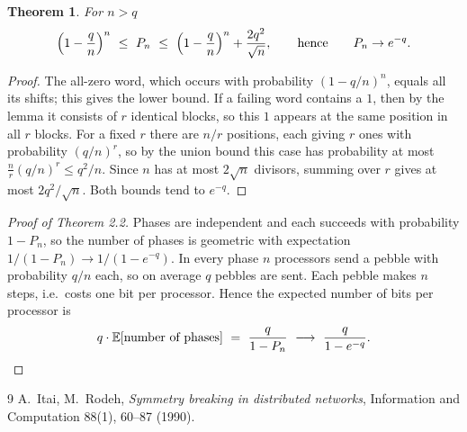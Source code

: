 \documentclass[11pt,a4paper]{article}
\newtheorem{theorem}{Theorem}
\begin{document}
\begin{theorem}
For $n>q$
\[
\Bigl(1-\frac qn\Bigr)^{n}\ \le\ P_n\ \le\ \Bigl(1-\frac qn\Bigr)^{n}+\frac{2q^2}{\sqrt n},
\qquad\text{hence}\qquad P_n\to e^{-q}.
\]
\end{theorem}
\begin{proof}
The all-zero word, which occurs with probability $(1-q/n)^n$, equals all its shifts; this gives the
lower bound. If a failing word contains a $1$, then by the lemma it consists of $r$ identical blocks,
so this $1$ appears at the same position in all $r$ blocks. For a fixed $r$ there are $n/r$
positions, each giving $r$ ones with probability $(q/n)^r$, so by the union bound this case has
probability at most $\frac nr(q/n)^r\le q^2/n$. Since $n$ has at most $2\sqrt n$ divisors, summing
over $r$ gives at most $2q^2/\sqrt n$. Both bounds tend to $e^{-q}$.
\end{proof}

\begin{proof}[Proof of Theorem 2.2]
Phases are independent and each succeeds with probability $1-P_n$, so the number of phases is
geometric with expectation $1/(1-P_n)\to 1/(1-e^{-q})$. In every phase $n$ processors send a
pebble with probability $q/n$ each, so on average $q$ pebbles are sent. Each pebble makes $n$
steps, i.e.\ costs one bit per processor. Hence the expected number of bits per processor is
\[
q\cdot\mathbb E[\text{number of phases}]\ =\ \frac q{1-P_n}\ \longrightarrow\ \frac q{1-e^{-q}}.
\qedhere
\]
\end{proof}

\begin{thebibliography}{9}
 A.~Itai, M.~Rodeh, \emph{Symmetry breaking in distributed networks}, Information and
  Computation 88(1), 60--87 (1990).
\end{thebibliography}
\end{document}

